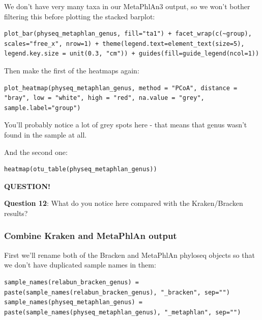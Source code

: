\documentclass[
]{book}
\newenvironment{bluebox}{
  \definecolor{shadecolor}{RGB}{172, 210, 237}
  \color{white}
  \begin{shaded}}
 {\end{shaded}}
\begin{document}
We don't have very many taxa in our MetaPhlAn3 output, so we won't bother filtering this before plotting the stacked barplot:

\begin{verbatim}
plot_bar(physeq_metaphlan_genus, fill="ta1") + facet_wrap(c(~group), scales="free_x", nrow=1) + theme(legend.text=element_text(size=5), legend.key.size = unit(0.3, "cm")) + guides(fill=guide_legend(ncol=1))
\end{verbatim}

Then make the first of the heatmaps again:

\begin{verbatim}
plot_heatmap(physeq_metaphlan_genus, method = "PCoA", distance = "bray", low = "white", high = "red", na.value = "grey", sample.label="group")
\end{verbatim}

You'll probably notice a lot of grey spots here - that means that genus wasn't found in the sample at all.

And the second one:

\begin{verbatim}
heatmap(otu_table(physeq_metaphlan_genus))
\end{verbatim}

\begin{bluebox}

\begin{center}
\textbf{QUESTION!}

\end{center}

\textbf{Question 12}: What do you notice here compared with the Kraken/Bracken results?

\end{bluebox}

\subsubsection{Combine Kraken and MetaPhlAn output}\label{combine-kraken-and-metaphlan-output}

First we'll rename both of the Bracken and MetaPhlAn phyloseq objects so that we don't have duplicated sample names in them:

\begin{verbatim}
sample_names(relabun_bracken_genus) = paste(sample_names(relabun_bracken_genus), "_bracken", sep="")
sample_names(physeq_metaphlan_genus) = paste(sample_names(physeq_metaphlan_genus), "_metaphlan", sep="")
\end{verbatim}
\end{document}
